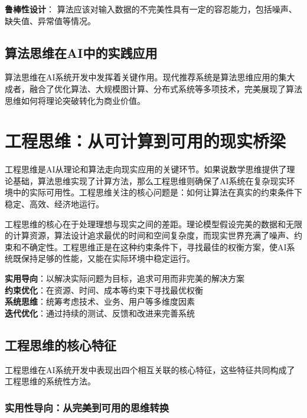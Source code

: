 \textbf{鲁棒性设计}：
算法应该对输入数据的不完美性具有一定的容忍能力，包括噪声、缺失值、异常值等情况。

\subsection{算法思维在AI中的实践应用}

算法思维在AI系统开发中发挥着关键作用。现代推荐系统是算法思维应用的集大成者，融合了优化算法、大规模图计算、分布式系统等多项技术，完美展现了算法思维如何将理论突破转化为商业价值。

\section{工程思维：从可计算到可用的现实桥梁}

工程思维是AI从理论和算法走向现实应用的关键环节。如果说数学思维提供了理论基础，算法思维实现了计算方法，那么工程思维则确保了AI系统在复杂现实环境中的实际可用性。工程思维关注的核心问题是：如何让算法在真实的约束条件下稳定、高效、经济地运行。

工程思维的核心在于处理理想与现实之间的差距。理论模型假设完美的数据和无限的计算资源，算法设计追求最优的时间和空间复杂度，而现实世界充满了噪声、约束和不确定性。工程思维正是在这种约束条件下，寻找最佳的权衡方案，使AI系统既保持足够的性能，又能在实际环境中稳定运行。

\begin{tcolorbox}[colback=orange!5!white,colframe=orange!75!black,title=核心概念：工程思维的四大支柱]
\textbf{实用导向}：以解决实际问题为目标，追求可用而非完美的解决方案\\
\textbf{约束优化}：在资源、时间、成本等约束下寻找最优权衡\\
\textbf{系统思维}：统筹考虑技术、业务、用户等多维度因素\\
\textbf{迭代优化}：通过持续的测试、反馈和改进来完善系统
\end{tcolorbox}

\subsection{工程思维的核心特征}

工程思维在AI系统开发中表现出四个相互关联的核心特征，这些特征共同构成了工程思维的系统性方法。

\subsubsection{实用性导向：从完美到可用的思维转换}

